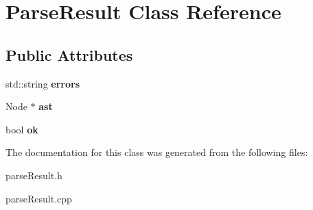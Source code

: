 \hypertarget{class_parse_result}{}\section{Parse\+Result Class Reference}
\label{class_parse_result}
\subsection*{Public Attributes}
\begin{DoxyCompactItemize}
\item 
\hypertarget{class_parse_result_ab2dd8deb95c5177148f488ca5d31307a}{}std\+::string {\bfseries errors}\label{class_parse_result_ab2dd8deb95c5177148f488ca5d31307a}

\item 
\hypertarget{class_parse_result_aa04c6ed3cba109f276e5bc089ca2ff15}{}Node $\ast$ {\bfseries ast}\label{class_parse_result_aa04c6ed3cba109f276e5bc089ca2ff15}

\item 
\hypertarget{class_parse_result_a64eb6658c1fc5bbf35fdce181f6845d5}{}bool {\bfseries ok}\label{class_parse_result_a64eb6658c1fc5bbf35fdce181f6845d5}

\end{DoxyCompactItemize}


The documentation for this class was generated from the following files\+:\begin{DoxyCompactItemize}
\item 
parse\+Result.\+h\item 
parse\+Result.\+cpp\end{DoxyCompactItemize}
